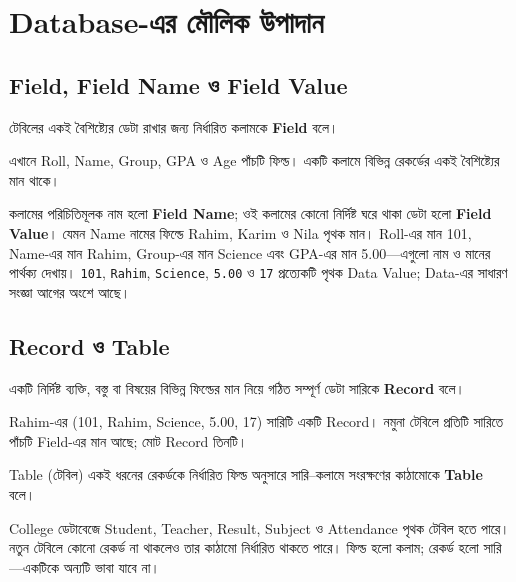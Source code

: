 \section{Database-এর মৌলিক উপাদান}
\subsection{Field, Field Name ও Field Value}
\begin{definitionbox}{}
টেবিলের একই বৈশিষ্ট্যের ডেটা রাখার জন্য নির্ধারিত কলামকে \textbf{Field} বলে।
\end{definitionbox}


এখানে Roll, Name, Group, GPA ও Age পাঁচটি ফিল্ড। একটি কলামে বিভিন্ন রেকর্ডের একই বৈশিষ্ট্যের মান থাকে।

কলামের পরিচিতিমূলক নাম হলো \textbf{Field Name}; ওই কলামের কোনো নির্দিষ্ট ঘরে থাকা ডেটা হলো \textbf{Field Value}। যেমন Name নামের ফিল্ডে Rahim, Karim ও Nila পৃথক মান। Roll-এর মান 101, Name-এর মান Rahim, Group-এর মান Science এবং GPA-এর মান 5.00—এগুলো নাম ও মানের পার্থক্য দেখায়। \texttt{101}, \texttt{Rahim}, \texttt{Science}, \texttt{5.00} ও \texttt{17} প্রত্যেকটি পৃথক Data Value; Data-এর সাধারণ সংজ্ঞা আগের অংশে আছে।

\subsection{Record ও Table}
\begin{definitionbox}{}
একটি নির্দিষ্ট ব্যক্তি, বস্তু বা বিষয়ের বিভিন্ন ফিল্ডের মান নিয়ে গঠিত সম্পূর্ণ ডেটা সারিকে \textbf{Record} বলে।
\end{definitionbox}
Rahim-এর (101, Rahim, Science, 5.00, 17) সারিটি একটি Record। নমুনা টেবিলে প্রতিটি সারিতে পাঁচটি Field-এর মান আছে; মোট Record তিনটি।

\begin{definitionbox}{Table (টেবিল)}
একই ধরনের রেকর্ডকে নির্ধারিত ফিল্ড অনুসারে সারি–কলামে সংরক্ষণের কাঠামোকে \textbf{Table} বলে।
\end{definitionbox}
College ডেটাবেজে Student, Teacher, Result, Subject ও Attendance পৃথক টেবিল হতে পারে। নতুন টেবিলে কোনো রেকর্ড না থাকলেও তার কাঠামো নির্ধারিত থাকতে পারে। ফিল্ড হলো কলাম; রেকর্ড হলো সারি—একটিকে অন্যটি ভাবা যাবে না।

